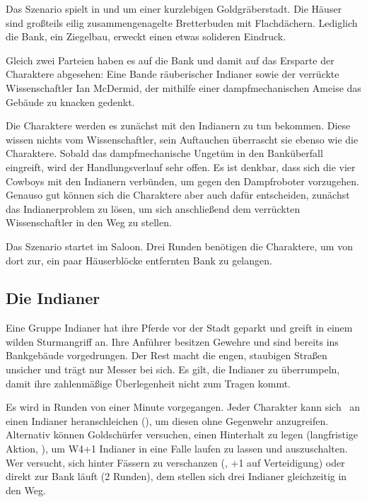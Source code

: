 {	

		\noindent
		Das Szenario spielt in und um einer kurzlebigen Goldgräberstadt. Die Häuser sind großteils eilig zusammengenagelte Bretterbuden mit Flachdächern. Lediglich die Bank, ein Ziegelbau, erweckt einen etwas solideren Eindruck.


		\noindent
		Gleich zwei Parteien haben es auf die Bank und damit auf das Ersparte der Charaktere abgesehen: Eine Bande räuberischer Indianer sowie der verrückte Wissenschaftler Ian McDermid, der mithilfe einer dampfmechanischen Ameise das Gebäude zu knacken gedenkt.

		Die Charaktere werden es zunächst mit den Indianern zu tun bekommen. Diese wissen nichts vom Wissenschaftler, sein Auftauchen überrascht sie ebenso wie die Charaktere. Sobald das dampfmechanische Ungetüm in den Banküberfall eingreift, wird der Handlungsverlauf sehr offen. Es ist denkbar, dass sich die vier Cowboys mit den Indianern verbünden, um gegen den Dampfroboter vorzugehen. Genauso gut können sich die Charaktere aber auch dafür entscheiden, zunächst das Indianerproblem zu lösen, um sich anschließend dem verrückten Wissenschaftler in den Weg zu stellen.

		Das Szenario startet im Saloon. Drei Runden benötigen die Charaktere, um von dort zur, ein paar Häuserblöcke entfernten Bank zu gelangen.

		\subsection{Die Indianer}

		Eine Gruppe Indianer hat ihre Pferde vor der Stadt geparkt und greift in einem wilden Sturmangriff an. Ihre Anführer besitzen Gewehre und sind bereits ins Bankgebäude vorgedrungen. Der Rest macht die engen, staubigen Straßen unsicher und trägt nur Messer bei sich. Es gilt, die Indianer zu überrumpeln, damit ihre zahlenmäßige Überlegenheit nicht zum Tragen kommt.

		Es wird in Runden von einer Minute vorgegangen. Jeder Charakter kann sich \zB\ an einen Indianer heranschleichen (), um diesen ohne Gegenwehr anzugreifen. Alternativ können Goldschürfer versuchen, einen Hinterhalt zu legen (langfristige Aktion, ), um W4+1 Indianer in eine Falle laufen zu lassen und auszuschalten. Wer versucht, sich hinter Fässern zu verschanzen (, +1 auf Verteidigung) oder direkt zur Bank läuft (2 Runden), dem stellen sich drei Indianer gleichzeitig in den Weg.

}
